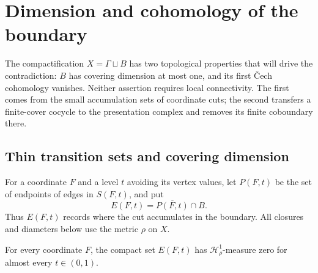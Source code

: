 \section{Dimension and cohomology of the boundary}
\label{sec:boundary-topology}

The compactification $X=\Gamma\sqcup B$ has two topological properties
that will drive the contradiction: $B$ has covering dimension at most one,
and its first \v{C}ech cohomology vanishes.  Neither assertion requires
local connectivity.  The first comes from the small accumulation sets of
coordinate cuts; the second transfers a finite-cover cocycle to the
presentation complex and removes its finite coboundary there.

\subsection{Thin transition sets and covering dimension}

For a coordinate $F$ and a level $t$ avoiding its vertex values, let
$P(F,t)$ be the set of endpoints of edges in $S(F,t)$, and put
\[
 E(F,t)=\overline{P(F,t)}\cap B.
\]
Thus $E(F,t)$ records where the cut accumulates in the boundary.
All closures and diameters below use the metric $\rho$ on $X$.

\begin{lemma}\label{topo:thin-walls}
For every coordinate $F$, the compact set $E(F,t)$ has
$\mathcal H^1_\rho$-measure zero for almost every $t\in(0,1)$.
\end{lemma}

